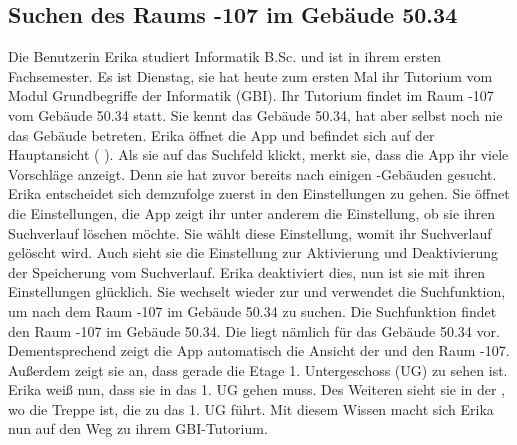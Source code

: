 \subsection{Suchen des Raums -107 im Gebäude 50.34}

Die Benutzerin Erika studiert Informatik B.Sc. und ist in ihrem ersten Fachsemester.
Es ist Dienstag, sie hat heute zum ersten Mal ihr Tutorium vom Modul Grundbegriffe der Informatik (GBI).
Ihr Tutorium findet im Raum -107 vom Gebäude 50.34 statt.
Sie kennt das Gebäude 50.34, hat aber selbst noch nie das Gebäude betreten.
Erika öffnet die App und befindet sich auf der Hauptansicht (%
).
Als sie auf das Suchfeld klickt, merkt sie, dass die App ihr viele Vorschläge anzeigt.
Denn sie hat zuvor bereits nach einigen %
-Gebäuden gesucht.
Erika entscheidet sich demzufolge zuerst in den Einstellungen zu gehen.
Sie öffnet die Einstellungen, die App zeigt ihr unter anderem die Einstellung, ob sie ihren Suchverlauf löschen möchte.
Sie wählt diese Einstellung, womit ihr Suchverlauf gelöscht wird.
Auch sieht sie die Einstellung zur Aktivierung und Deaktivierung der Speicherung vom Suchverlauf.
Erika deaktiviert dies, nun ist sie mit ihren Einstellungen glücklich.
Sie wechselt wieder zur %
und verwendet die Suchfunktion, um nach dem Raum -107 im Gebäude 50.34 zu suchen.
Die Suchfunktion findet den Raum -107 im Gebäude 50.34.
Die %
liegt nämlich für das Gebäude 50.34 vor.
Dementsprechend zeigt die App automatisch die Ansicht der %
und den Raum -107.
Außerdem zeigt sie an, dass gerade die Etage 1. Untergeschoss (UG) zu sehen ist.
Erika weiß nun, dass sie in das 1. UG gehen muss.
Des Weiteren sieht sie in der %
, wo die Treppe ist, die zu das 1. UG führt.
Mit diesem Wissen macht sich Erika nun auf den Weg zu ihrem GBI-Tutorium.